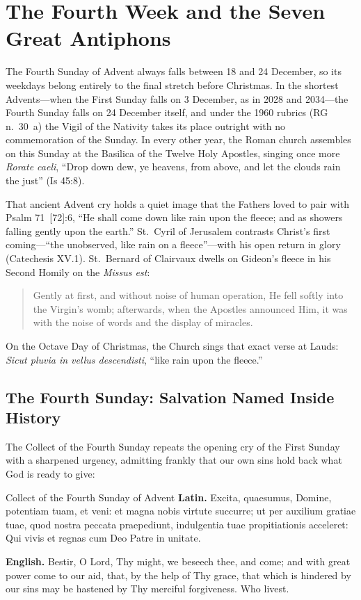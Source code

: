 \section{The Fourth Week and the Seven Great Antiphons}\label{sec:week-4}

The Fourth Sunday of Advent always falls between 18 and 24 December, so its
weekdays belong entirely to the final stretch before Christmas. In the shortest
Advents---when the First Sunday falls on 3 December, as in 2028 and 2034---the
Fourth Sunday falls on 24 December itself, and under the 1960 rubrics (RG
n.~30~a) the Vigil of the Nativity takes its place outright with no
commemoration of the Sunday. In every other year, the Roman church assembles on
this Sunday at the Basilica of the Twelve Holy Apostles, singing once more
\textit{Rorate caeli}, ``Drop down dew, ye heavens, from above, and let the
clouds rain the just'' (Is 45:8).

That ancient Advent cry holds a quiet image that the Fathers loved to pair with
Psalm 71~[72]:6, ``He shall come down like rain upon the fleece; and as showers
falling gently upon the earth.'' St.~Cyril of Jerusalem contrasts Christ's
first coming---``the unobserved, like rain on a fleece''---with his open return
in glory (Catechesis XV.1). St.~Bernard of Clairvaux dwells on Gideon's fleece
in his Second Homily on the \textit{Missus est}:

\begin{quote}
Gently at first, and without noise of human operation, He fell softly into the
Virgin's womb; afterwards, when the Apostles announced Him, it was with the
noise of words and the display of miracles.
\end{quote}

On the Octave Day of Christmas, the Church sings that exact verse at Lauds:
\textit{Sicut pluvia in vellus descendisti}, ``like rain upon the fleece.''

\subsection{The Fourth Sunday: Salvation Named Inside History}

The Collect of the Fourth Sunday repeats the opening cry of the First Sunday
with a sharpened urgency, admitting frankly that our own sins hold back what
God is ready to give:

\begin{massbox}{Collect of the Fourth Sunday of Advent}
\textbf{Latin.} Excita, quaesumus, Domine, potentiam tuam, et veni: et magna
nobis virtute succurre; ut per auxilium gratiae tuae, quod nostra peccata
praepediunt, indulgentia tuae propitiationis acceleret: Qui vivis et regnas cum
Deo Patre in unitate.

\textbf{English.} Bestir, O Lord, Thy might, we beseech thee, and come; and
with great power come to our aid, that, by the help of Thy grace, that which is
hindered by our sins may be hastened by Thy merciful forgiveness. Who livest.
\end{massbox}

